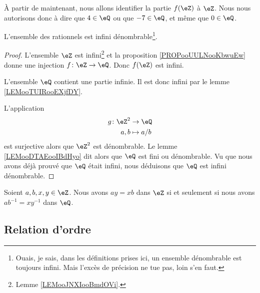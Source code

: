 \begin{normaltext}
	À partir de maintenant, nous allons identifier la partie \( f(\eZ)\) à \( \eZ\). Nous nous autorisons donc à dire que \( 4\in \eQ\) ou que \( -7\in \eQ\), et même que \( 0\in \eQ\).
\end{normaltext}

\begin{proposition}     \label{PROPooDHIAooZysvNs}
	L'ensemble des rationnels est infini dénombrable\footnote{Ouais, je sais, dans les définitions prises ici, un ensemble dénombrable est toujours infini. Mais l'excès de précision ne tue pas, loin s'en faut.}.
\end{proposition}

\begin{proof}
	L'ensemble \( \eZ\) est infini\footnote{Lemme \ref{LEMooJNXIooBmdOVi}.} et la proposition \ref{PROPooUULNooKbwuEw} donne une injection \( f\colon \eZ\to \eQ\). Donc \( f(\eZ)\) est infini.

	L'ensemble \( \eQ\) contient une partie infinie. Il est donc infini par le lemme \ref{LEMooTUIRooEXjfDY}.

	L'application
	\begin{equation}
		\begin{aligned}
			g\colon \eZ^2 & \to \eQ     \\
			a,b           & \mapsto a/b
		\end{aligned}
	\end{equation}
	est surjective alors que \( \eZ^2\) est dénombrable. Le lemme \ref{LEMooDTAEooIBdHyo} dit alors que \( \eQ\) est fini ou dénombrable. Vu que nous avons déjà prouvé que \( \eQ\) était infini, nous déduisons que \( \eQ\) est infini dénombrable.
\end{proof}

\begin{lemma}       \label{LEMooBJRCooIZnaid}
    Soient \( a,b,x,y\in \eZ\). Nous avons \( ay=xb\) dans \( \eZ\) si et seulement si nous avons \( ab^{-1}=xy^{-1}\) dans \( \eQ\).
\end{lemma}

\subsection{Relation d'ordre}

